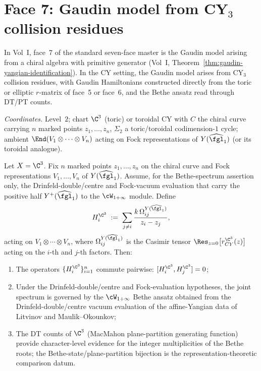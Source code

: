 \section{Face 7: Gaudin model from CY\texorpdfstring{$_3$}{-3} collision residues}
\label{sec:face7-cy3-gaudin}

In Vol~I, face~7 of the standard seven-face master is the Gaudin
model arising from a chiral algebra with primitive generator
\textup{(}Vol~I,
Theorem~\ref{thm:gaudin-yangian-identification}\textup{)}. In the CY
setting, the Gaudin model arises from CY$_3$ collision residues,
with Gaudin Hamiltonians constructed directly from the toric or
elliptic $r$-matrix of face~5 or face~6, and the Bethe ansatz read
through DT/PT counts.

\smallskip
\noindent\emph{Coordinates.} Level~$2$; chart $\C^3$
\textup{(}toric\textup{)} or toroidal CY with $C$ the chiral curve
carrying $n$ marked points $z_1, \ldots, z_n$, $\Sigma_2$ a
toric/toroidal codimension-$1$ cycle; ambient
$\End(V_1 \otimes \cdots \otimes V_n)$ acting on Fock
representations of $Y(\widehat{\fgl}_1)$ \textup{(}or its toroidal
analogue\textup{)}.

\begin{theorem}
\label{thm:face7-cy3-gaudin}
Let $X = \C^3$. Fix $n$ marked points $z_1, \ldots, z_n$ on the chiral
curve and Fock representations $V_1, \ldots, V_n$ of
$Y(\widehat{\fgl}_1)$. Assume, for the Bethe-spectrum assertion only,
the Drinfeld-double/centre and Fock-vacuum evaluation that carry the
positive half \(Y^+(\widehat{\fgl}_1)\) to the
\(\cW_{1+\infty}\) module. Define
\[
 H_i^{\C^3} \;:=\; \sum_{j \neq i} \frac{k\,\Omega_{ij}^{Y(\widehat{\fgl}_1)}}{z_i - z_j},
\]
acting on $V_1 \otimes \cdots \otimes V_n$, where
$\Omega_{ij}^{Y(\widehat{\fgl}_1)}$ is the Casimir tensor
$\Res_{z=0}\bigl[r_{CY}^{\C^3}(z)\bigr]$ acting on the $i$-th and
$j$-th factors. Then:
\begin{enumerate}[label=(\roman*)]
\item The operators $\{H_i^{\C^3}\}_{i=1}^n$ commute pairwise:
$[H_i^{\C^3}, H_j^{\C^3}] = 0$;
\item Under the Drinfeld-double/centre and Fock-evaluation hypotheses,
the joint spectrum is governed by the $\cW_{1+\infty}$ Bethe
ansatz obtained from the Drinfeld-double/centre vacuum evaluation of
the affine-Yangian data of Litvinov and Maulik--Okounkov;
\item The DT counts of $\C^3$ (MacMahon plane-partition generating
function) provide character-level evidence for the integer
multiplicities of the Bethe roots; the Bethe-state/plane-partition
bijection is the representation-theoretic comparison datum.
\end{enumerate}
\end{theorem}

